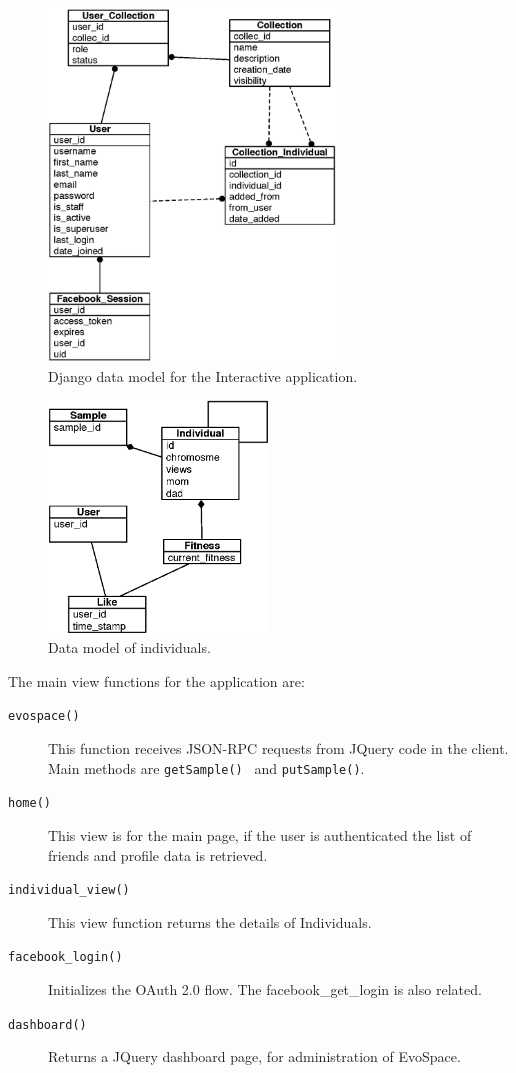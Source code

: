 \documentclass{sig-alternate}
\begin{document}
\begin{figure}[!t]
    \centering
        \includegraphics[width=3in]{datamodel.eps}
    \caption{Django data model for the Interactive application.}
    \label{datamodel}
\end{figure}

\begin{figure}[!t]
    \centering
        \includegraphics[width=2.3in]{redisModel.eps}
    \caption{Data model of individuals.}
    \label{redisModel}
\end{figure}

The main view functions for the application are:

\begin{description}

\item[\texttt{evospace()}] This function receives JSON-RPC requests from JQuery code in the client. Main methods are \texttt{getSample() } and \texttt{putSample()}.
\item[\texttt{home()}] This view is for the main page, if the user is authenticated the list of friends and profile data is retrieved.
\item [\texttt{individual\_view()}] This view function returns the details of Individuals.
\item [\texttt{facebook\_login()}] Initializes the OAuth 2.0 flow. The facebook\_get\_login is also related.
\item [\texttt{dashboard()}] Returns a JQuery dashboard page, for administration of EvoSpace.
\end{description}
\end{document}
